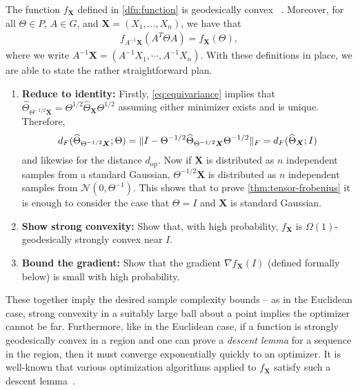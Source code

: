 \documentclass{article}
\DeclarePairedDelimiter{\norm}{\lVert}{\rVert}
\newcommand{\op}{\operatorname{op}}
\renewcommand{\vec}{\bm}
\newcommand\cN{\mathcal{N}}
\newcommand{\TODO}[1]{{\color{blue}[TODO: #1]}}
\begin{document}
The function $f_{\vec X}$ defined in \cref{dfn:function} is geodesically convex%
~\cite{burgisser2019towards}.
Moreover, for all $\Theta \in P$, $A \in G$, and $\vec X=(X_1,\dots,X_n)$, we have that
\begin{align}\label{eq:equivariance}
  f_{A^{-1} \vec X}(A^T \Theta A) = f_{\vec X}(\Theta),
\end{align}
where we write $A^{-1} \vec X = (A^{-1} X_1,\cdots,A^{-1} X_n)$.
With these definitions in place, we are able to state the rather straightforward plan.

\begin{enumerate}
\item\label{it:reduce} \textbf{Reduce to identity:}
Firstly, \cref{eq:equivariance} implies that $\widehat\Theta_{\Theta^{-1/2} \vec X} = \Theta^{1/2} \widehat\Theta_{\vec X} \Theta^{1/2}$ assuming either minimizer exists and is unique.
Therefore,
\begin{align*}
  d_F(\widehat\Theta_{\Theta^{-1/2} \vec X}; \Theta)
= \norm{ I - \Theta^{-1/2} \widehat\Theta_{\Theta^{-1/2} \vec X} \Theta^{-1/2} }_F
= d_F(\widehat\Theta_{\vec X}; I)
\end{align*}
and likewise for the distance $d_{\op}$.
Now if $\vec X$ is distributed as $n$ independent samples from a standard Gaussian, $\Theta^{-1/2} \vec X$ is distributed as $n$ independent samples from $\cN(0, \Theta^{-1})$.
This shows that to prove \cref{thm:tensor-frobenius} it is enough to consider the case that $\Theta = I$ and $\vec X$ is standard Gaussian.
\item\label{it:convexity} \textbf{Show strong convexity:}
Show that, with high probability, $f_{\vec X}$ is $\Omega(1)$-geodesically strongly convex near $I$.
\item\label{it:grad} \textbf{Bound the gradient:}
Show that the gradient $\nabla f_{\vec X}(I)$ (defined formally below) is small with high probability.
\end{enumerate}

These together imply the desired sample complexity bounds -- as in the Euclidean case, strong convexity in a suitably large ball about a point implies the optimizer cannot be far.
Furthermore, like in the Euclidean case, if a function is strongly geodesically convex in a region and one can prove a \emph{descent lemma} for a sequence in the region, then it must converge exponentially quickly to an optimizer.
It is well-known that various optimization algorithms applied to $f_{\vec X}$ satisfy such a descent lemma~\cite{burgisser2019towards}.
\end{document}
